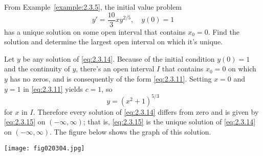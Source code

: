 \documentclass{ximera}
\begin{document}
\begin{example}
\begin{explanation}
\end{explanation}
\end{example}

\begin{example}\label{example:2.3.8}
From Example~\ref{example:2.3.5}, the initial value
problem
\begin{equation} \label{eq:2.3.14}
y'=\frac{10}{3}xy^{2/5}, \quad y(0)=1
\end{equation}
 has a unique solution on some open interval that contains $x_0=0$.
Find the solution and determine the largest open interval on which it's
unique.
\begin{explanation}
Let $y$ be any solution of \eqref{eq:2.3.14}. Because of the initial
condition $y(0)=1$ and the continuity of $y$, there's an open interval
$I$ that contains $x_0=0$ on which $y$ has no zeros, and is consequently
of the form \eqref{eq:2.3.11}. Setting $x=0$ and $y=1$ in \eqref{eq:2.3.11}
yields $c=1$, so
\begin{equation} \label{eq:2.3.15}
y=(x^2+1)^{5/3}
\end{equation}
for $x$ in $I$. Therefore every solution of \eqref{eq:2.3.14}
differs from zero and is given by \eqref{eq:2.3.15} on $(-\infty,\infty)$;
that is, \eqref{eq:2.3.15} is the unique solution of \eqref{eq:2.3.14} on
$(-\infty,\infty)$.
The figure below shows the graph of this solution.

\begin{image}
 \texttt{[image: fig020304.jpg]}
\end{image}
\end{explanation}
\end{example}
\end{document}

